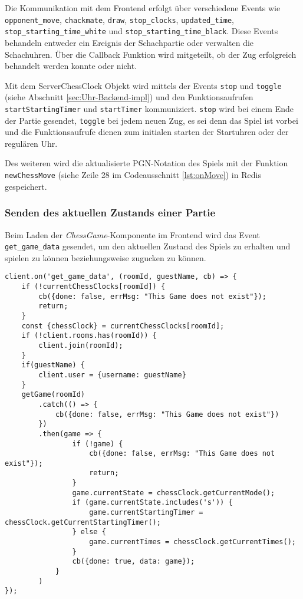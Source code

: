 Die Kommunikation mit dem Frontend erfolgt über verschiedene Events wie \verb|opponent_move|, \verb|chackmate|, \verb|draw|, \verb|stop_clocks|, \verb|updated_time|, \verb|stop_starting_time_white| und \verb|stop_starting_time_black|. Diese Events behandeln entweder ein Ereignis der Schachpartie oder verwalten die Schachuhren. Über die Callback Funktion wird mitgeteilt, ob der Zug erfolgreich behandelt werden konnte oder nicht.

Mit dem ServerChessClock Objekt wird mittels der Events \verb|stop| und \verb|toggle| (siehe Abschnitt \ref{sec:Uhr-Backend-impl}) und den Funktionsaufrufen \verb|startStartingTimer| und \verb|startTimer| kommuniziert. \verb|stop| wird bei einem Ende der Partie gesendet, \verb|toggle| bei jedem neuen Zug, es sei denn das Spiel ist vorbei und die Funktionsaufrufe dienen zum initialen starten der Startuhren oder der regulären Uhr.

Des weiteren wird die aktualisierte PGN-Notation des Spiels mit der Funktion \verb|newChessMove| (siehe Zeile 28 im Codeausschnitt \ref{lst:onMove}) in Redis gespeichert.

\subsubsection{Senden des aktuellen Zustands einer Partie}
Beim Laden der \textit{ChessGame}-Komponente im Frontend wird das Event \verb|get_game_data| gesendet, um den aktuellen Zustand des Spiels zu erhalten und spielen zu können beziehungsweise zugucken zu können. 


\begin{lstlisting}[style=codeStyle, caption={Der Listener des get\_game\_data Events zum übermitteln des Schachspiels}, label={lst:get_game_data}]
client.on('get_game_data', (roomId, guestName, cb) => {
    if (!currentChessClocks[roomId]) {
        cb({done: false, errMsg: "This Game does not exist"});
        return;
    }
    const {chessClock} = currentChessClocks[roomId];
    if (!client.rooms.has(roomId)) {
        client.join(roomId);
    }
    if(guestName) {
        client.user = {username: guestName}
    }
    getGame(roomId)
        .catch(() => {
            cb({done: false, errMsg: "This Game does not exist"})
        })
        .then(game => {
                if (!game) {
                    cb({done: false, errMsg: "This Game does not exist"});
                    return;
                }
                game.currentState = chessClock.getCurrentMode();
                if (game.currentState.includes('s')) {
                    game.currentStartingTimer = chessClock.getCurrentStartingTimer();
                } else {
                    game.currentTimes = chessClock.getCurrentTimes();
                }
                cb({done: true, data: game});
            }
        )
});
\end{lstlisting}

